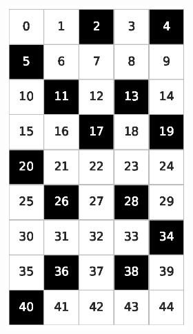 \begin{figure}[h!]
\begin{subfigure}[b]{\textwidth}
\begin{subfigure}[b]{0.20\textwidth}
            \includegraphics[width=\columnwidth]{images/Tai45c_9x5_30.eps}
        \end{subfigure}
        \hspace{3em}
        \begin{subfigure}[b]{0.20\textwidth}

\end{subfigure}
\end{subfigure}
\end{figure}
